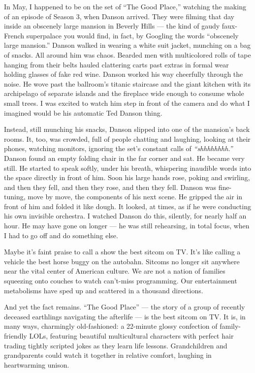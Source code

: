 In May, I happened to be on the set of ``The Good Place,'' watching the
making of an episode of Season 3, when Danson arrived. They were filming
that day inside an obscenely large mansion in Beverly Hills --- the kind
of gaudy faux-French superpalace you would find, in fact, by Googling
the words ``obscenely large mansion.'' Danson walked in wearing a white
suit jacket, munching on a bag of snacks. All around him was chaos.
Bearded men with multicolored rolls of tape hanging from their belts
hauled clattering carts past extras in formal wear holding glasses of
fake red wine. Danson worked his way cheerfully through the noise. He
wove past the ballroom's titanic staircase and the giant kitchen with
its archipelago of separate islands and the fireplace wide enough to
consume whole small trees. I was excited to watch him step in front of
the camera and do what I imagined would be his automatic Ted Danson
thing.

Instead, still munching his snacks, Danson slipped into one of the
mansion's back rooms. It, too, was crowded, full of people chatting and
laughing, looking at their phones, watching monitors, ignoring the set's
constant calls of \emph{``shhhhhhhh.''} Danson found an empty folding
chair in the far corner and sat. He became very still. He started to
speak softly, under his breath, whispering inaudible words into the
space directly in front of him. Soon his large hands rose, poking and
swirling, and then they fell, and then they rose, and then they fell.
Danson was fine-tuning, move by move, the components of his next scene.
He gripped the air in front of him and folded it like dough. It looked,
at times, as if he were conducting his own invisible orchestra. I
watched Danson do this, silently, for nearly half an hour. He may have
gone on longer --- he was still rehearsing, in total focus, when I had
to go off and do something else.

Maybe it's faint praise to call a show the best sitcom on TV. It's like
calling a vehicle the best horse buggy on the autobahn. Sitcoms no
longer sit anywhere near the vital center of American culture. We are
not a nation of families squeezing onto couches to watch can't-miss
programming. Our entertainment metabolisms have sped up and scattered in
a thousand directions.

And yet the fact remains. ``The Good Place'' --- the story of a group of
recently deceased earthlings navigating the afterlife --- is the best
sitcom on TV. It is, in many ways, charmingly old-fashioned: a 22-minute
glossy confection of family-friendly LOLs, featuring beautiful
multicultural characters with perfect hair trading tightly scripted
jokes as they learn life lessons. Grandchildren and grandparents could
watch it together in relative comfort, laughing in heartwarming unison.


